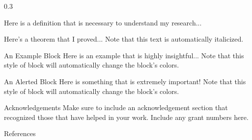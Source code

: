 \documentclass{msuposter}
\newcommand{\colwidth}{0.3\linewidth}
\begin{document}
\begin{frame}{}
\begin{columns}[t]
\begin{column}{\colwidth}
\begin{definition}[My Definition]
Here is a definition that is necessary to understand my research...
\end{definition}

\begin{theorem}
Here's a theorem that I proved...  Note that this text is automatically italicized.
\end{theorem}

\begin{exampleblock}{An Example Block}
Here is an example that is highly insightful...  Note that this style of block will automatically change the block's colors.
\end{exampleblock}

\begin{alertblock}{An Alerted Block}
Here is something that is extremely important!  Note that this style of block will automatically change the block's colors.
\end{alertblock}

\begin{block}{Acknowledgements}
Make sure to include an acknowledgement section that recognized those that have helped in your work. Include any grant numbers here. 
\end{block}

\begin{block}{References} %
\scriptsize


\end{block}

\end{column}

\end{columns}
\end{frame}
\end{document}
